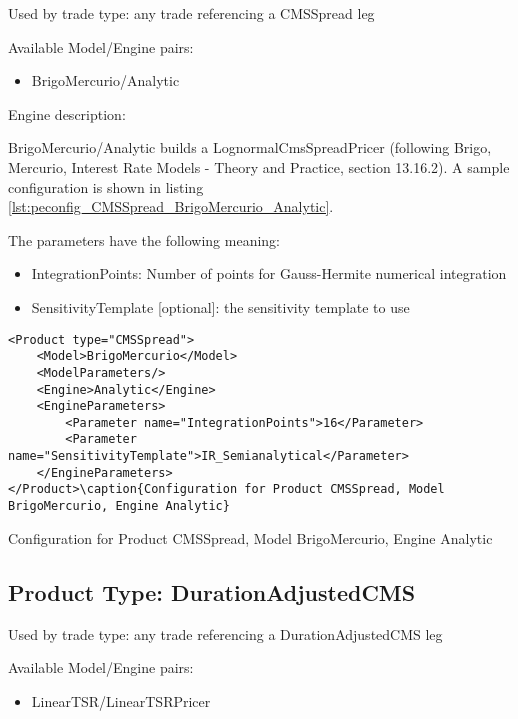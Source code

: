 Used by trade type: any trade referencing a CMSSpread leg

Available Model/Engine pairs:

\begin{itemize}
  \item BrigoMercurio/Analytic
\end{itemize}

Engine description:

BrigoMercurio/Analytic builds a LognormalCmsSpreadPricer (following Brigo, Mercurio, Interest Rate Models - Theory and
Practice, section 13.16.2). A sample configuration is shown in listing
\ref{lst:peconfig_CMSSpread_BrigoMercurio_Analytic}.

The parameters have the following meaning:

\begin{itemize}
\item IntegrationPoints: Number of points for Gauss-Hermite numerical integration
\item SensitivityTemplate [optional]: the sensitivity template to use 
\end{itemize}

\begin{longlisting}
\begin{verbatim}
<Product type="CMSSpread">
    <Model>BrigoMercurio</Model>
    <ModelParameters/>
    <Engine>Analytic</Engine>
    <EngineParameters>
        <Parameter name="IntegrationPoints">16</Parameter>
        <Parameter name="SensitivityTemplate">IR_Semianalytical</Parameter>
    </EngineParameters>
</Product>\caption{Configuration for Product CMSSpread, Model BrigoMercurio, Engine Analytic}
\end{verbatim}
\caption{Configuration for Product CMSSpread, Model BrigoMercurio, Engine Analytic}
\label{lst:peconfig_CMSSpread_BrigoMercurio_Analytic}
\end{longlisting}

\subsection{Product Type: DurationAdjustedCMS}

Used by trade type: any trade referencing a DurationAdjustedCMS leg

Available Model/Engine pairs:

\begin{itemize}
  \item LinearTSR/LinearTSRPricer
\end{itemize}

